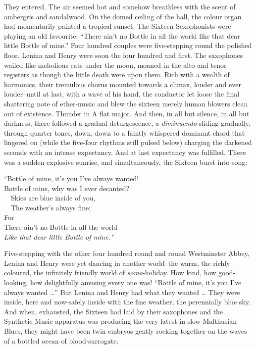 \documentclass[12pt]{report}
\begin{document}
They entered. The air seemed hot and somehow breathless with the scent
of ambergris and sandalwood. On the domed ceiling of the hall, the
colour organ had momentarily painted a tropical sunset. The Sixteen
Sexophonists were playing an old favourite: ``There ain't no Bottle in
all the world like that dear little Bottle of mine.'' Four hundred
couples were five-stepping round the polished floor. Lenina and Henry
were soon the four hundred and first. The saxophones wailed like
melodious cats under the moon, moaned in the alto and tenor registers as
though the little death were upon them. Rich with a wealth of harmonics,
their tremulous chorus mounted towards a climax, louder and ever
louder--until at last, with a wave of his hand, the conductor let loose
the final shattering note of ether-music and blew the sixteen merely
human blowers clean out of existence. Thunder in A flat major. And then,
in all but silence, in all but darkness, there followed a gradual
deturgescence, a \emph{diminuendo} sliding gradually, through quarter
tones, down, down to a faintly whispered dominant chord that lingered on
(while the five-four rhythms still pulsed below) charging the darkened
seconds with an intense expectancy. And at last expectancy was
fulfilled. There was a sudden explosive sunrise, and simultaneously, the
Sixteen burst into song:

\emph{}

``Bottle of mine, it's you I've always wanted!\\

Bottle of mine, why was I ever decanted?\\

~~Skies are blue inside of you,\\

~~The weather's always fine;\\

For\\

There ain't no Bottle in all the world\\

\emph{Like that dear little Bottle of mine."\\
}

Five-stepping with the other four hundred round and round Westminster
Abbey, Lenina and Henry were yet dancing in another world--the warm, the
richly coloured, the infinitely friendly world of \emph{soma}-holiday.
How kind, how good-looking, how delightfully amusing every one was!
``Bottle of mine, it's you I've always wanted \ldots{}'' But Lenina and
Henry had what they wanted \ldots{} They were inside, here and
now-safely inside with the fine weather, the perennially blue sky. And
when, exhausted, the Sixteen had laid by their saxophones and the
Synthetic Music apparatus was producing the very latest in slow
Malthusian Blues, they might have been twin embryos gently rocking
together on the waves of a bottled ocean of blood-surrogate.
\end{document}
